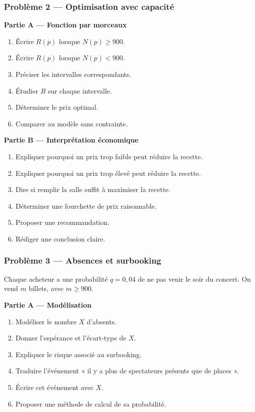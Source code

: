 \documentclass[11pt,a4paper]{article}
\begin{document}
\begin{difficile}
\subsubsection*{Problème 2 — Optimisation avec capacité}

\textbf{Partie A — Fonction par morceaux}
\begin{enumerate}
  \item Écrire $R(p)$ lorsque $N(p)\geq900$.
  \item Écrire $R(p)$ lorsque $N(p)<900$.
  \item Préciser les intervalles correspondants.
  \item Étudier $R$ sur chaque intervalle.
  \item Déterminer le prix optimal.
  \item Comparer au modèle sans contrainte.
\end{enumerate}

\textbf{Partie B — Interprétation économique}
\begin{enumerate}
  \item Expliquer pourquoi un prix trop faible peut réduire la recette.
  \item Expliquer pourquoi un prix trop élevé peut réduire la recette.
  \item Dire si remplir la salle suffit à maximiser la recette.
  \item Déterminer une fourchette de prix raisonnable.
  \item Proposer une recommandation.
  \item Rédiger une conclusion claire.
\end{enumerate}

\subsubsection*{Problème 3 — Absences et surbooking}

Chaque acheteur a une probabilité $q=0{,}04$ de ne pas venir le soir du concert. On vend $m$ billets, avec $m\geq900$.

\textbf{Partie A — Modélisation}
\begin{enumerate}
  \item Modéliser le nombre $X$ d'absents.
  \item Donner l'espérance et l'écart-type de $X$.
  \item Expliquer le risque associé au surbooking.
  \item Traduire l'événement « il y a plus de spectateurs présents que de places ».
  \item Écrire cet événement avec $X$.
  \item Proposer une méthode de calcul de sa probabilité.
\end{enumerate}


\end{difficile}
\end{document}
